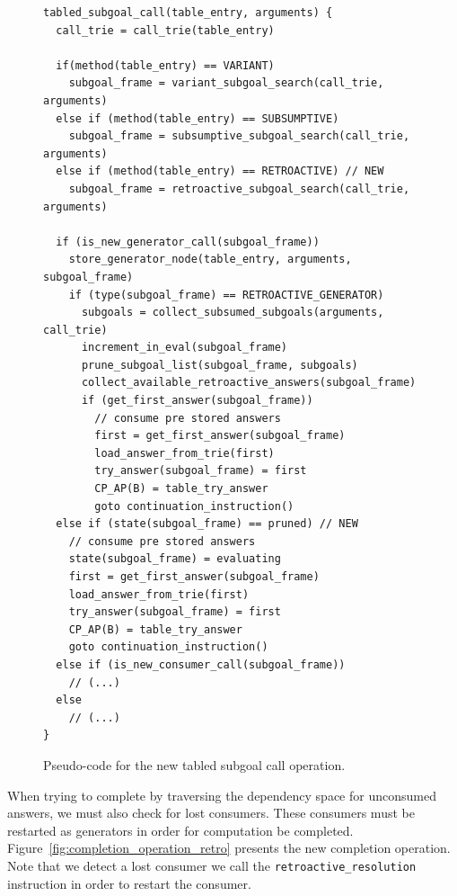 \begin{figure}[ht]
\begin{Verbatim}
tabled_subgoal_call(table_entry, arguments) {
  call_trie = call_trie(table_entry)
  
  if(method(table_entry) == VARIANT)
    subgoal_frame = variant_subgoal_search(call_trie, arguments)
  else if (method(table_entry) == SUBSUMPTIVE)
    subgoal_frame = subsumptive_subgoal_search(call_trie, arguments)
  else if (method(table_entry) == RETROACTIVE) // NEW
    subgoal_frame = retroactive_subgoal_search(call_trie, arguments)
  
  if (is_new_generator_call(subgoal_frame))
    store_generator_node(table_entry, arguments, subgoal_frame)
    if (type(subgoal_frame) == RETROACTIVE_GENERATOR)
      subgoals = collect_subsumed_subgoals(arguments, call_trie)
      increment_in_eval(subgoal_frame)
      prune_subgoal_list(subgoal_frame, subgoals)
      collect_available_retroactive_answers(subgoal_frame)
      if (get_first_answer(subgoal_frame))
        // consume pre stored answers
        first = get_first_answer(subgoal_frame)
        load_answer_from_trie(first)
        try_answer(subgoal_frame) = first
        CP_AP(B) = table_try_answer
        goto continuation_instruction()
  else if (state(subgoal_frame) == pruned) // NEW
    // consume pre stored answers
    state(subgoal_frame) = evaluating
    first = get_first_answer(subgoal_frame)
    load_answer_from_trie(first)
    try_answer(subgoal_frame) = first
    CP_AP(B) = table_try_answer
    goto continuation_instruction()
  else if (is_new_consumer_call(subgoal_frame))
    // (...)
  else
    // (...)
}
\end{Verbatim}
\caption{Pseudo-code for the new tabled subgoal call operation.}
\label{fig:tabled_subgoal_call_retro}
\end{figure}

When trying to complete by traversing the dependency space for unconsumed answers, we must
also check for lost consumers. These consumers must be restarted as generators in order for
computation be completed. Figure~\ref{fig:completion_operation_retro} presents the new completion
operation. Note that we detect a lost consumer we call the \texttt{retroactive\_resolution}
instruction in order to restart the consumer.

